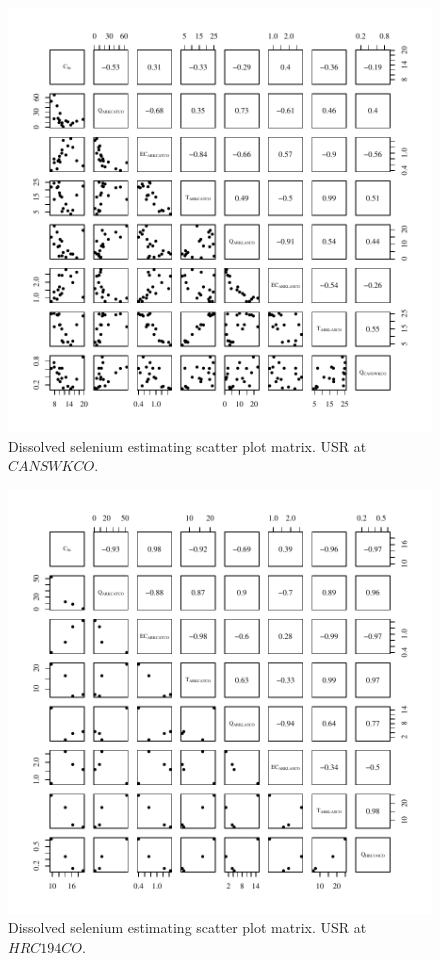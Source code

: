 \begin{figure}[htbp]
	\begin{center}
	\includegraphics[width=6in]{"Figures/Results_USR/Conc Model Full PairsCAN"}
	\caption{Dissolved selenium estimating scatter plot matrix.  USR at $CANSWKCO$.}
	\end{center}
\end{figure}

\begin{figure}[htbp]
	\begin{center}
	\includegraphics[width=6in]{"Figures/Results_USR/Conc Model Full PairsHRC"}
	\caption{Dissolved selenium estimating scatter plot matrix.  USR at $HRC194CO$.}
	\end{center}
\end{figure}

